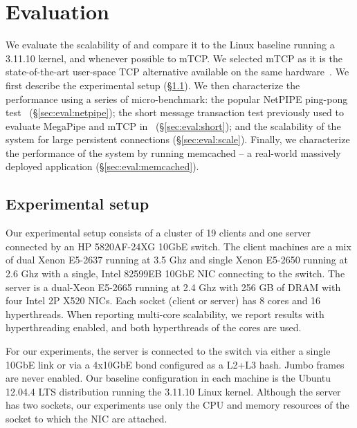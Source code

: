 
\section{Evaluation}
\label{sec:eval}

We evaluate the scalability of \ix and compare it to the Linux
baseline running a 3.11.10 kernel, and whenever possible to mTCP.  We
selected mTCP as it is the state-of-the-art user-space TCP alternative
available on the same hardware~\cite{jeong2014mtcp}.  We first
describe the experimental setup (\S\ref{sec:eval:setup}).  We then
characterize the performance using a series of micro-benchmark: the
popular NetPIPE ping-pong test~\cite{snell1996netpipe}
(\S\ref{sec:eval:netpipe}); the short message transaction test
previously used to evaluate MegaPipe and mTCP
in~\cite{han2012megapipe,jeong2014mtcp} (\S\ref{sec:eval:short}); and
the scalability of the system for large persistent connections
(\S\ref{sec:eval:scale}).  Finally, we characterize the performance of
the \ix system by running memcached -- a real-world massively deployed
application (\S\ref{sec:eval:memcached}).


\subsection{Experimental setup}
\label{sec:eval:setup}

Our experimental setup consists of a cluster of 19 clients and one
server connected by an HP 5820AF-24XG 10GbE switch.  The client
machines are a mix of dual Xenon E5-2637 running at 3.5 Ghz and single Xenon E5-2650 running at 2.6 Ghz with a single, Intel
82599EB 10GbE NIC connecting to the switch.  The server is a dual-Xeon E5-2665
running at 2.4 Ghz with 256 GB of DRAM with four Intel 2P X520 NICs.  Each
socket (client or server) has 8 cores and 16 hyperthreads.  When
reporting multi-core scalability, we report results with
hyperthreading enabled, and both hyperthreads of the cores are used.

For our experiments, the server is connected to the switch via either
a single 10GbE link or via a 4x10GbE bond configured as a L2+L3 hash.
Jumbo frames are never enabled.  Our
baseline configuration in each machine is the Ubuntu 12.04.4 LTS
distribution running the 3.11.10 Linux kernel.  Although the server
has two sockets, our experiments use only the CPU and memory resources
of the socket to which the NIC are attached.  

